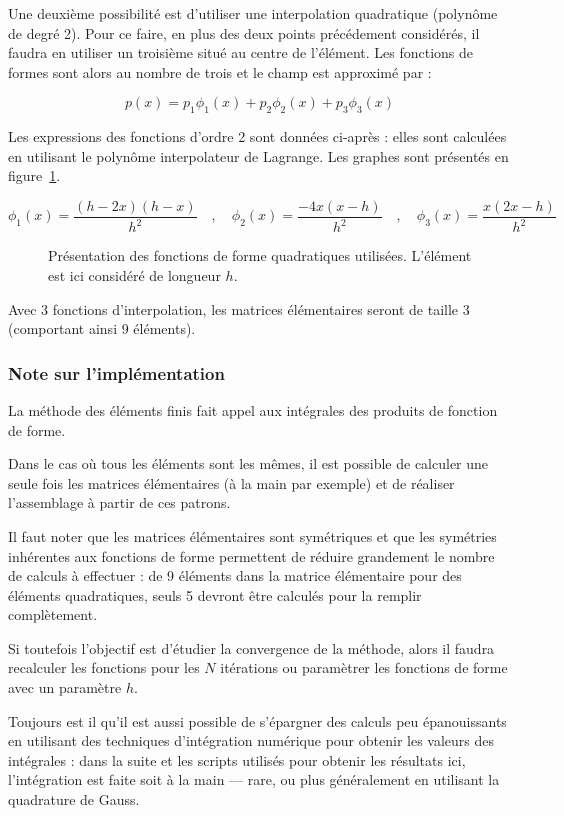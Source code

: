 Une deuxième possibilité est d'utiliser une interpolation quadratique (polynôme de degré 2). Pour ce faire, en plus des
deux points précédement considérés, il faudra en utiliser un troisième situé au centre de l'élément. Les fonctions de
formes sont alors au nombre de trois et le champ est approximé par :

$$p(x) = p_1\phi_1(x) + p_2\phi_2(x) + p_3\phi_3(x)$$

Les expressions des fonctions d'ordre 2 sont données ci-après : elles sont calculées en utilisant le polynôme
interpolateur de Lagrange. Les graphes sont présentés en figure~\ref{fig:FEM:shape_fun_quad}.

\begin{equation*}
	\phi_1(x) = \frac{(h-2x)(h-x)}{h^2} \quad,\quad \phi_2(x) = \frac{-4x(x-h)}{h^2} \quad,\quad \phi_3(x) = \frac{x(2x-h)}{h^2}
\end{equation*}

\begin{figure}[!ht]
	\centering
	
	\caption{\label{fig:FEM:shape_fun_quad}Présentation des fonctions de forme quadratiques utilisées. L'élément est ici considéré
	de longueur $h$.}
\end{figure}

Avec 3 fonctions d'interpolation, les matrices élémentaires seront de taille 3 (comportant ainsi 9 éléments).

\subsubsection{Note sur l'implémentation}

La méthode des éléments finis fait appel aux intégrales des produits de fonction de forme.

Dans le cas où tous les éléments sont les mêmes, il est possible de calculer une seule fois les matrices élémentaires (à
la main par exemple) et de réaliser l'assemblage à partir de ces patrons.

Il faut noter que les matrices élémentaires sont symétriques et que les symétries inhérentes aux fonctions de forme
permettent de réduire grandement le nombre de calculs à effectuer : de 9 éléments dans la matrice élémentaire pour des
éléments quadratiques, seuls 5 devront être calculés pour la remplir complètement. 

Si toutefois l'objectif est d'étudier la convergence de la méthode, alors il faudra recalculer les fonctions pour les
$N$ itérations ou paramètrer les fonctions de forme avec un paramètre $h$.

Toujours est il qu'il est aussi possible de s'épargner des calculs peu épanouissants en utilisant des techniques
d'intégration numérique pour obtenir les valeurs des intégrales : dans la suite et les scripts utilisés pour obtenir les
résultats ici, l'intégration est faite soit à la main --- rare, ou plus généralement en utilisant la quadrature de
Gauss.

